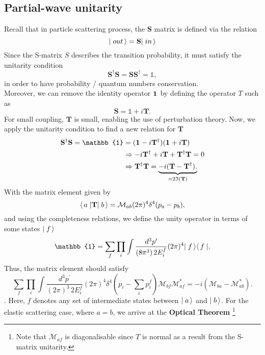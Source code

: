  \subsection{Partial-wave unitarity}
Recall that in particle scattering process, the $\mathbf S$ matrix is defined via the relation
\begin{equation}
	\mbox{$\mid out\,\rangle$} = \mathbf{S} \mbox{$\mid in\,\rangle$}
\end{equation}
Since the S-matrix $S$ describes the transition probability, it must satisfy the unitarity condition
\begin{equation}
	\mathbf{S^\dagger S = S S^\dagger }= \mathbb{1},
\end{equation}
in order to have probability / quantum numbers conservation. \\ Moreover, we can remove the identity operator $\irrep{1}$ by defining the operator $T$ such as 
\begin{equation}
	\mathbf{S} =\mathbb{1} + i\mathbf{T} .
\end{equation}
For small coupling, $\mathbf{T}$ is small, enabling the use of perturbation theory. Now, we apply the unitarity condition to find a new relation for $\mathbf{T}$
\begin{align}
	\mathbf{S^\dagger S}  =\mathbb{1} &=(\irrep{1}-i \mathbf{T}^\dagger)(\irrep{1}+i \mathbf{T}) \nonumber \\
	&\Rightarrow -i \mathbf{T}^\dagger + i \mathbf{T} +\mathbf{T}^\dagger \mathbf{T} =0 \\
	&\Rightarrow  \mathbf{T}^\dagger \mathbf{T} = \underbrace{-i(\mathbf{T-T}^\dagger). }_{= 2 \mathfrak{I} (\mathbf{T}) }\nonumber 
\end{align}
With the matrix element given by 
\begin{equation}
	\mbox{$\langle\, a \mid$}\mathbf{T}\mbox{$\mid b\,\rangle$} = \mathcal M_{ab} (2 \pi)^4 \delta^4(p_a-p_b),
\end{equation}
and using the completeness relations, we define the unity operator in terms of some states $\mbox{$\mid f\,\rangle$}$
\begin{equation}
	\mathbb{1} =  \sum_{f} \prod_{i} \int \frac{d^3p^\prime}{(8 \pi^3)\,2E_i^f}  (2 \pi)^4 \ket{f}\bra{f}.
\end{equation}
Thus, the matrix element should satisfy 
\begin{equation}
	\sum_{f} \prod_{i} \int \frac{d^3p^\prime}{(2 \pi)^3\,2E_i^f} (2 \pi)^4 \delta^4(p_i-\sum_i p^f_i) \mathcal M_{bf} \mathcal M_{af}^* = -i (\mathcal M_{ba}- \mathcal M_{ab}^* ).
\end{equation}.
Here, $f$ denotes any set of intermediate states between $\mbox{$\mid a\,\rangle$}$ and $\mbox{$\mid b\,\rangle$}$. For the elastic scattering case, where $a =b$, we arrive at the {\bf Optical Theorem }\footnote{Note that $\mathcal M_{af}$ is diagonalisable since $T$ is normal as a result from the S-matrix unitarity.}

